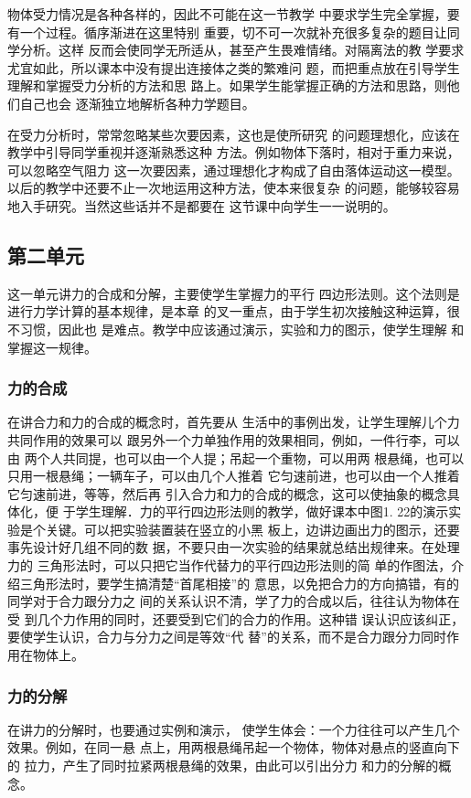 物体受力情况是各种各样的，因此不可能在这一节教学
中要求学生完全掌握，要有一个过程。循序渐进在这里特别
重要，切不可一次就补充很多复杂的题目让同学分析。这样
反而会使同学无所适从，甚至产生畏难情绪。对隔离法的教
学要求尤宜如此，所以课本中没有提出连接体之类的繁难问
题，而把重点放在引导学生理解和掌握受力分析的方法和思
路上。如果学生能掌握正确的方法和思路，则他们自己也会
逐渐独立地解析各种力学题目。

在受力分析时，常常忽略某些次要因素，这也是使所研究
的问题理想化，应该在教学中引导同学重视并逐渐熟悉这种
方法。例如物体下落时，相对于重力来说，可以忽略空气阻力
这一次要因素，通过理想化才构成了自由落体运动这一模型。
以后的教学中还要不止一次地运用这种方法，使本来很复杂
的问题，能够较容易地入手研究。当然这些话并不是都要在
这节课中向学生一一说明的。

\subsection{第二单元}
这一单元讲力的合成和分解，主要使学生掌握力的平行
四边形法则。这个法则是进行力学计算的基本规律，是本章
的叉一重点，由于学生初次接触这种运算，很不习惯，因此也
是难点。教学中应该通过演示，实验和力的图示，使学生理解
和掌握这一规律。

\subsubsection{力的合成}
在讲合力和力的合成的概念时，首先要从
生活中的事例出发，让学生理解儿个力共同作用的效果可以
跟另外一个力单独作用的效果相同，例如，一件行李，可以由
两个人共同提，也可以由一个人提；吊起一个重物，可以用两
根悬绳，也可以只用一根悬绳；一辆车子，可以由几个人推着
它匀速前进，也可以由一个人推着它匀速前进，等等，然后再
引入合力和力的合成的概念，这可以使抽象的概念具体化，便
于学生理解．力的平行四边形法则的教学，做好课本中图1.
22的演示实验是个关键。可以把实验装置装在竖立的小黑
板上，边讲边画出力的图示，还要事先设计好几组不同的数
据，不要只由一次实验的结果就总结出规律来。在处理力的
三角形法时，可以只把它当作代替力的平行四边形法则的简
单的作图法，介绍三角形法时，要学生搞清楚“首尾相接”的
意思，以免把合力的方向搞错，有的同学对于合力跟分力之
间的关系认识不清，学了力的合成以后，往往认为物体在受
到几个力作用的同时，还要受到它们的合力的作用。这种错
误认识应该纠正，要使学生认识，合力与分力之间是等效“代
替”的关系，而不是合力跟分力同时作用在物体上。

\subsubsection{力的分解}   在讲力的分解时，也要通过实例和演示，
使学生体会：一个力往往可以产生几个效果。例如，在同一悬
点上，用两根悬绳吊起一个物体，物体对悬点的竖直向下的
拉力，产生了同时拉紧两根悬绳的效果，由此可以引出分力
和力的分解的概念。


